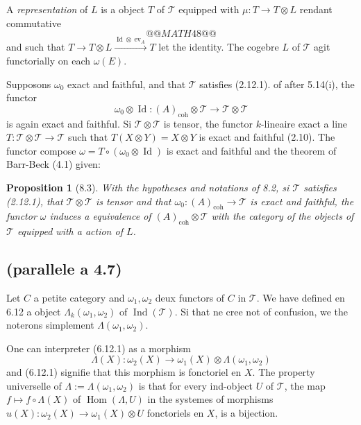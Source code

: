 \documentclass[12pt,a4paper]{article}
\theoremstyle{plain}
\newtheorem{proposition}[theorem]{Proposition}
\theoremstyle{definition}
\DeclareMathOperator{\Hom}{Hom}
\DeclareMathOperator{\Id}{Id}
\DeclareMathOperator{\ev}{ev}
\DeclareMathOperator{\Ind}{Ind}
\newcommand{\coh}{\mathrm{coh}}
\begin{document}
A \emph{representation} of $L$ is a object $T$ of $\mathcal{T}$ equipped with $\mu : T \to T \otimes L$ rendant commutative
\[
@@MATH48@@
\]
and such that $T \to T \otimes L \xrightarrow{\Id \otimes \ev_A} T$ let the identity. The cogebre $L$ of $\mathcal{T}$ agit functorially on each $\omega(E)$.

Supposons $\omega_0$ exact and faithful, and that $\mathcal{T}$ satisfies (2.12.1). of after 5.14(i), the functor
\[
\omega_0 \otimes \Id : (A)_{\coh} \otimes \mathcal{T} \to \mathcal{T} \otimes \mathcal{T}
\]
is again exact and faithful. Si $\mathcal{T} \otimes \mathcal{T}$ is tensor, the functor $k$-lineaire exact a line $T : \mathcal{T} \otimes \mathcal{T} \to \mathcal{T}$ such that $T(X \otimes Y) = X \otimes Y$ is exact and faithful (2.10). The functor compose $\omega = T \circ (\omega_0 \otimes \Id)$ is exact and faithful and the theorem of Barr-Beck (4.1) given:

\begin{proposition}[8.3]
With the hypotheses and notations of 8.2, si $\mathcal{T}$ satisfies (2.12.1), that $\mathcal{T} \otimes \mathcal{T}$ is tensor and that $\omega_0 : (A)_{\coh} \to \mathcal{T}$ is exact and faithful, the functor $\omega$ induces a equivalence of $(A)_{\coh} \otimes \mathcal{T}$ with the category of the objects of $\mathcal{T}$ equipped with a action of $L$.
\end{proposition}

\subsection{(parallele a 4.7)}

Let $C$ a petite category and $\omega_1, \omega_2$ deux functors of $C$ in $\mathcal{T}$. We have defined en 6.12 a object $\Lambda_k(\omega_1, \omega_2)$ of $\Ind(\mathcal{T})$. Si that ne cree not of confusion, we the noterons simplement $\Lambda(\omega_1, \omega_2)$.

One can interpreter (6.12.1) as a morphism
\begin{equation}\label{eq:8.4.1}
\Lambda(X) : \omega_2(X) \to \omega_1(X) \otimes \Lambda(\omega_1, \omega_2)
\end{equation}
and (6.12.1) signifie that this morphism is fonctoriel en $X$. The property universelle of $\Lambda := \Lambda(\omega_1, \omega_2)$ is that for every ind-object $U$ of $\mathcal{T}$, the map $f \mapsto f \circ \Lambda(X)$ of $\Hom(\Lambda, U)$ in the systemes of morphisms $u(X) : \omega_2(X) \to \omega_1(X) \otimes U$ fonctoriels en $X$, is a bijection.
\end{document}
